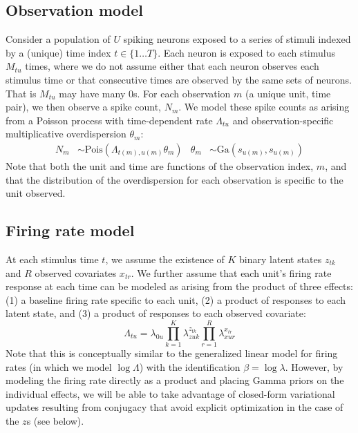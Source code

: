 \documentclass{article} %
\begin{document}
\subsection{Observation model}
Consider a population of $U$ spiking neurons exposed to a series of stimuli indexed by a (unique) time index $t\in \lbrace 1\ldots T\rbrace$. Each neuron is exposed to each stimulus $M_{tu}$ times, where we do not assume either that each neuron observes each stimulus time or that consecutive times are observed by the same sets of neurons. That is $M_{tu}$ may have many 0s. For each observation $m$ (a unique unit, time pair), we then observe a spike count, $N_m$. We model these spike counts as arising from a Poisson process with time-dependent rate $\Lambda_{tu}$ and observation-specific multiplicative overdispersion $\theta_m$:
\begin{align}
    \label{obs_model}
    N_{m} &\sim \text{Pois}(\Lambda_{t(m), u(m)} \theta_m) &
    \theta_m &\sim \text{Ga}(s_{u(m)}, s_{u(m)})
\end{align}
Note that both the unit and time are functions of the observation index, $m$, and that the distribution of the overdispersion for each observation is specific to the unit observed. 

\subsection{Firing rate model}
At each stimulus time $t$, we assume the existence of $K$ binary latent states $z_{tk}$ and $R$ observed covariates $x_{tr}$. We further assume that each unit's firing rate response at each time can be modeled as arising from the product of three effects: (1) a baseline firing rate specific to each unit, (2) a product of responses to each latent state, and (3) a product of responses to each observed covariate:
\begin{equation}
    \label{fr_model}
    \Lambda_{tu} = \lambda_{0u} \prod_{k = 1}^K \lambda_{zuk}^{z_{tk}}  
    \prod_{r = 1}^R \lambda_{xur}^{x_{tr}}   
\end{equation} 
Note that this is conceptually similar to the generalized linear model for firing rates (in which we model $\log \Lambda$) with the identification $\beta = \log \lambda$. However, by modeling the firing rate directly as a product and placing Gamma priors on the individual effects, we will be able to take advantage of closed-form variational updates resulting from conjugacy that avoid explicit optimization in the case of the $z$s (see below). 
\end{document}
